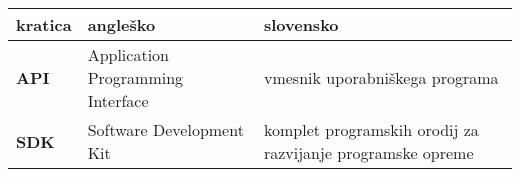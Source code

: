 \begin{tabular}{l|l|l}
  {\bf kratica} & {\bf angleško} & {\bf slovensko} \\ \hline
  {\bf API} & Application Programming Interface & vmesnik uporabniškega programa \\
  {\bf SDK} & Software Development Kit & komplet programskih orodij za razvijanje programske opreme \\
\end{tabular}
